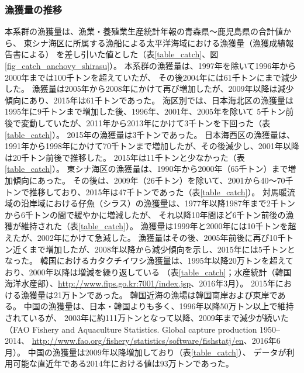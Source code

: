 \subsubsection{漁獲量の推移}
本系群の漁獲量は、漁業・養殖業生産統計年報の青森県～鹿児島県の合計値から、
東シナ海区に所属する漁船による太平洋海域における漁獲量（漁獲成績報告書による）
を差し引いた値とした（表\ref{table_catch}、図\ref{fig_catch_anchovy_shirasu}）。
本系群の漁獲量は、1997年を除いて1996年から2000年までは100千トンを超えていたが、
その後2004年には61千トンにまで減少した。
漁獲量は2005年から2008年にかけて再び増加したが、2009年以降は減少傾向にあり、2015年は61千トンであった。
%
%
 海区別では、日本海北区の漁獲量は1995年に9千トンまで増加した後、1996年、2001年、2005年を除いて
 5千トン前後で変動していたが、2011年から2013年にかけて3千トンを下回った（表\ref{table_catch}）。
 2015年の漁獲量は3千トンであった。
日本海西区の漁獲量は、1991年から1998年にかけて70千トンまで増加したが、その後減少し、2001年以降は20千トン前後で推移した。
2015年は11千トンと少なかった（表\ref{table_catch}）。
東シナ海区の漁獲量は、1990年から2000年（65千トン）まで増加傾向にあった。
その後は、2009年（26千トン）を除いて、2001から40～70千トンで推移しており、2015年は47千トンであった（表\ref{table_catch}）。
%
%
対馬暖流域の沿岸域における仔魚（シラス）の漁獲量は、1977年以降1987年まで2千トンから6千トンの間で緩やかに増減したが、
それ以降10年間ほど6千トン前後の漁獲が維持された（表\ref{table_catch}）。
漁獲量は1999年と2000年には10千トンを超えたが、2002年にかけて急減した。
漁獲量はその後、2005年前後に再び10千トン近くまで増加したが、2008年以降から減少傾向を示し、2015年には5千トンとなった。
%
%
韓国におけるカタクチイワシ漁獲量は、1995年以降20万トンを超えており、2000年以降は増減を繰り返している
（表\ref{table_catch}；水産統計（韓国海洋水産部）、\url{http://www.fips.go.kr:7001/index.jsp}、2016年3月）。
2015年における漁獲量は21万トンであった。
韓国近海の漁場は韓国南岸および東岸である\citep{Korfish2000}。
%
%
中国の漁獲量は、日本・韓国よりも多く、1996年以降50万トン以上で維持されているが、
2003年に約111万トンとなって以降、2009年まで減少が続いた
（FAO Fishery and Aquaculture Statistics. Global capture production 1950--2014、
\url{http://www.fao.org/fishery/statistics/software/fishstatj/en}、2016年6月）。
中国の漁獲量は2009年以降増加しており（表\ref{table_catch}）、
データが利用可能な直近年である2014年における値は93万トンであった。
